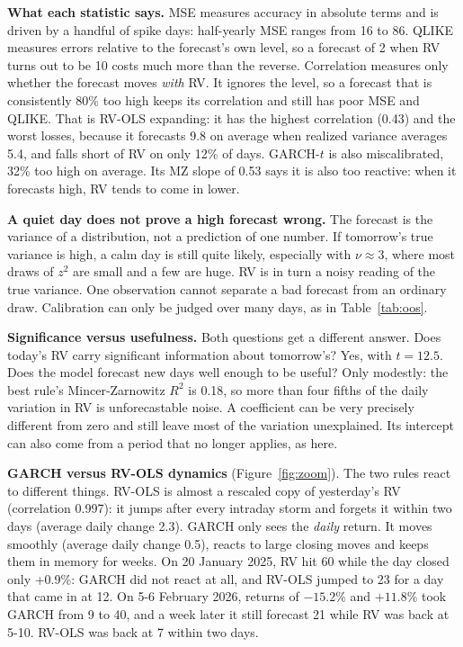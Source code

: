 \documentclass[10pt,a4paper]{article}
\begin{document}
\textbf{What each statistic says.} MSE measures accuracy in absolute terms and is driven by a handful of spike days:
half-yearly MSE ranges from 16 to 86. QLIKE measures errors relative to the forecast's own level, so a forecast of 2
when RV turns out to be 10 costs much more than the reverse. Correlation measures only whether the forecast moves
\emph{with} RV. It ignores the level, so a forecast that is consistently 80\% too high keeps its correlation and still
has poor MSE and QLIKE. That is RV-OLS expanding: it has the highest correlation (0.43) and the worst losses, because
it forecasts 9.8 on average when realized variance averages 5.4, and falls short of RV on only 12\% of days. GARCH-$t$
is also miscalibrated, 32\% too high on average. Its MZ slope of 0.53 says it is also too reactive: when it forecasts high,
RV tends to come in lower.

\textbf{A quiet day does not prove a high forecast wrong.} The forecast is the variance of a distribution, not a
prediction of one number. If tomorrow's true variance is high, a calm day is still quite likely, especially with
$\nu\approx3$, where most draws of $z^2$ are small and a few are huge. RV is in turn a noisy reading of the true
variance. One observation cannot separate a bad forecast from an ordinary draw. Calibration can only be judged over
many days, as in Table~\ref{tab:oos}.

\textbf{Significance versus usefulness.} Both questions get a different answer. Does today's RV carry significant
information about tomorrow's? Yes, with $t=12.5$. Does the model forecast new days well enough to be useful? Only
modestly: the best rule's Mincer-Zarnowitz $R^2$ is 0.18, so more than four fifths of the daily variation in RV is
unforecastable noise. A coefficient can be very precisely different from zero and still leave most of the variation
unexplained. Its intercept can also come from a period that no longer applies, as here.

\textbf{GARCH versus RV-OLS dynamics} (Figure~\ref{fig:zoom}). The two rules react to different things. RV-OLS is
almost a rescaled copy of yesterday's RV (correlation 0.997): it jumps after every intraday storm and forgets it within
two days (average daily change 2.3). GARCH only sees the \emph{daily} return. It moves smoothly (average daily change
0.5), reacts to large closing moves and keeps them in memory for weeks. On 20 January 2025, RV hit 60 while the day closed
only +0.9\%: GARCH did not react at all, and RV-OLS jumped to 23 for a day that came in at 12. On 5-6 February
2026, returns of $-15.2\%$ and $+11.8\%$ took GARCH from 9 to 40, and a week later it still forecast 21 while RV was back
at 5-10. RV-OLS was back at 7 within two days.
\end{document}
